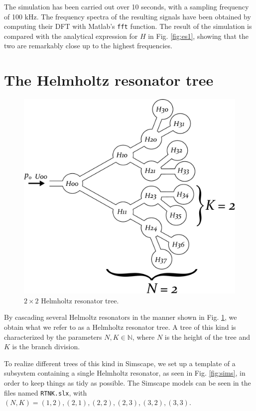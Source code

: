 \documentclass[a4paper]{article}
\begin{document}
The simulation has been carried out over 10 seconds, with a sampling frequency of 100 kHz. The frequency spectra of the resulting signals have been obtained by computing their DFT with Matlab's \texttt{fft} function. The result of the simulation is compared with the analytical expression for $H$ in Fig. \ref{fig:es1}, showing that the two are remarkably close up to the highest frequencies.




\section{The Helmholtz resonator tree}

\begin{figure}[h!]
	\centering
	\includegraphics[width=0.7\linewidth]{tree.pdf}
	\caption{$2\times2$ Helmholtz resonator tree.}
	\label{fig:tree}
\end{figure}

By cascading several Helmoltz resonators in the manner shown in Fig. \ref{fig:tree}, we obtain what we refer to as a Helmholtz resonator tree. A tree of this kind is characterized by the parameters $N, K \in \mathbb{N}$, where $N$ is the height of the tree and $K$ is the branch division.

To realize different trees of this kind in Simscape, we set up a template of a subsystem containing a single Helmholtz resonator, as seen in Fig. \ref{fig:sims}, in order to keep things as tidy as possible. The Simscape models can be seen in the files named \texttt{RTNK.slx}, with $(N, K) = (1,2), (2,1), (2, 2), (2, 3), (3,2), (3,3)$.
\end{document}
